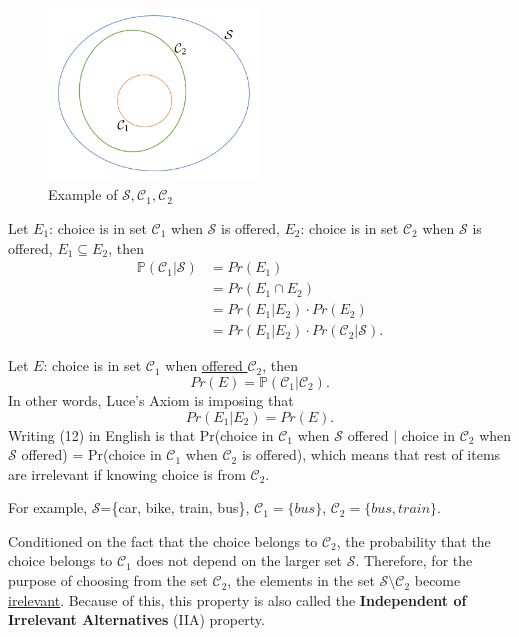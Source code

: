 \documentclass[11pt]{article}
\begin{document}
\begin{figure}[H]
	\centering
	\includegraphics[width=0.5\textwidth]{f2.png}
	\caption{Example of $\mathcal{S},\mathcal{C}_1,\mathcal{C}_2$}
\end{figure}

Let $E_1$: choice is in set $\mathcal{C}_1$ when $\mathcal{S}$ is offered, $E_2$: choice is in set $\mathcal{C}_2$ when $\mathcal{S}$ is offered, $E_1 \subseteq E_2$, then
\begin{align}
\mathbb{P}(\mathcal{C}_1|\mathcal{S})&=Pr(E_1)\\
&=Pr(E_1\cap E_2)\\
&=Pr(E_1|E_2)\cdot Pr(E_2)\\
&=Pr(E_1|E_2)\cdot Pr(\mathcal{C}_2|\mathcal{S}).
\end{align}

Let $E$: choice is in set $\mathcal{C}_1$ when \underline{offered $\mathcal{C}_2$}, then
\begin{equation}
Pr(E) = \mathbb{P}(\mathcal{C}_1|\mathcal{C}_2).
\end{equation}
In other words, Luce's Axiom is imposing that
\begin{equation}
Pr(E_1|E_2)=Pr(E).
\end{equation}
Writing (12) in English is that Pr(choice in $\mathcal{C}_1$ when $\mathcal{S}$ offered $|$ choice in $\mathcal{C}_2$ when $\mathcal{S}$ offered) = Pr(choice in $\mathcal{C}_1$ when $\mathcal{C}_2$ is offered), which means that rest of items are irrelevant if knowing choice is from $\mathcal{C}_2$.

For example, $\mathcal{S}$=\{car, bike, train, bus\}, $\mathcal{C}_1=\{bus\}$, $\mathcal{C}_2=\{bus,train\}$.

Conditioned on the fact that the choice belongs to $\mathcal{C_2}$, the probability that the choice belongs to $\mathcal{C}_1$ does not depend on the larger set $\mathcal{S}$. Therefore, for the purpose of choosing from the set $\mathcal{C}_2$, the elements in the set $\mathcal{S} \setminus \mathcal{C}_2$ become \underline{irelevant}. Because of this, this property is also called the \textbf{Independent of Irrelevant Alternatives} (IIA) property.
\end{document}
